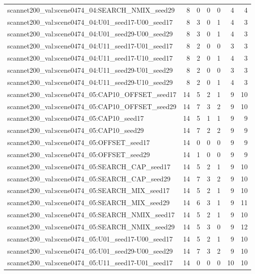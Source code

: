 \begin{table}[t]
\begin{tabular}{lrrrrrr}
scannet200\_val:scene0474\_04:SEARCH\_NMIX\_seed29 & 8 & 0 & 0 & 0 & 4 & 4 \\
scannet200\_val:scene0474\_04:U01\_seed17-U00\_seed17 & 8 & 3 & 0 & 1 & 4 & 3 \\
scannet200\_val:scene0474\_04:U01\_seed29-U00\_seed29 & 8 & 3 & 0 & 1 & 4 & 3 \\
scannet200\_val:scene0474\_04:U11\_seed17-U01\_seed17 & 8 & 2 & 0 & 0 & 3 & 3 \\
scannet200\_val:scene0474\_04:U11\_seed17-U10\_seed17 & 8 & 2 & 0 & 1 & 4 & 3 \\
scannet200\_val:scene0474\_04:U11\_seed29-U01\_seed29 & 8 & 2 & 0 & 0 & 3 & 3 \\
scannet200\_val:scene0474\_04:U11\_seed29-U10\_seed29 & 8 & 2 & 0 & 1 & 4 & 3 \\
scannet200\_val:scene0474\_05:CAP10\_OFFSET\_seed17 & 14 & 5 & 2 & 1 & 9 & 10 \\
scannet200\_val:scene0474\_05:CAP10\_OFFSET\_seed29 & 14 & 7 & 3 & 2 & 9 & 10 \\
scannet200\_val:scene0474\_05:CAP10\_seed17 & 14 & 5 & 1 & 1 & 9 & 9 \\
scannet200\_val:scene0474\_05:CAP10\_seed29 & 14 & 7 & 2 & 2 & 9 & 9 \\
scannet200\_val:scene0474\_05:OFFSET\_seed17 & 14 & 0 & 0 & 0 & 9 & 9 \\
scannet200\_val:scene0474\_05:OFFSET\_seed29 & 14 & 1 & 0 & 0 & 9 & 9 \\
scannet200\_val:scene0474\_05:SEARCH\_CAP\_seed17 & 14 & 5 & 2 & 1 & 9 & 10 \\
scannet200\_val:scene0474\_05:SEARCH\_CAP\_seed29 & 14 & 7 & 3 & 2 & 9 & 10 \\
scannet200\_val:scene0474\_05:SEARCH\_MIX\_seed17 & 14 & 5 & 2 & 1 & 9 & 10 \\
scannet200\_val:scene0474\_05:SEARCH\_MIX\_seed29 & 14 & 6 & 3 & 1 & 9 & 11 \\
scannet200\_val:scene0474\_05:SEARCH\_NMIX\_seed17 & 14 & 5 & 2 & 1 & 9 & 10 \\
scannet200\_val:scene0474\_05:SEARCH\_NMIX\_seed29 & 14 & 5 & 3 & 0 & 9 & 12 \\
scannet200\_val:scene0474\_05:U01\_seed17-U00\_seed17 & 14 & 5 & 2 & 1 & 9 & 10 \\
scannet200\_val:scene0474\_05:U01\_seed29-U00\_seed29 & 14 & 7 & 3 & 2 & 9 & 10 \\
scannet200\_val:scene0474\_05:U11\_seed17-U01\_seed17 & 14 & 0 & 0 & 0 & 10 & 10 \\

\end{tabular}
\end{table}
